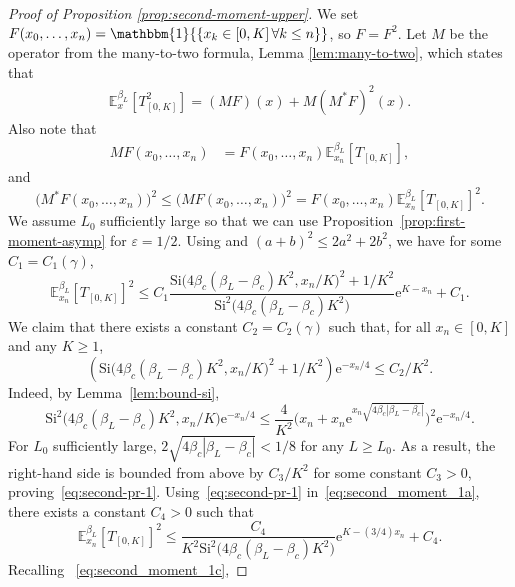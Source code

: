 \documentclass[a4paper, a4wide, 10pt, reqno]{amsart}
\theoremstyle{plain}
\theoremstyle{definition}
\numberwithin{equation}{section}
\newcommand{\E}{\mathbb E}
\newcommand{\re}{{\mathrm e}}
\newcommand{\Si}{{\mathrm{Si}}}
\newcommand{\Ind}[1]{\mathbbm{1}{\{#1\}}}
\begin{document}
\begin{proof}[Proof of  Proposition \ref{prop:second-moment-upper}]
	We set $F(x_0,\ldots,x_n) = \Ind{x_k\in [0, K]\,\forall k\le n}$, so $F=F^2$. Let $M$ be the operator from the many-to-two formula, Lemma \ref{lem:many-to-two}, which states that
	\begin{align}
		\label{eq:second_moment_1}
		\E_x^{\beta_L}[T_{[0, K]}^2] = (MF)(x) + M(M^\ast F)^2(x).
	\end{align}
	Also note that
\begin{align}\label{eq:second_moment_1b}
		MF(x_0,\ldots,x_n) &= F(x_0,\ldots,x_n)\E_{x_n}^{\beta_L}[T_{[0, K]}],
	\end{align}
    and 
    \begin{equation}\label{eq:second_moment_1c}
        \big(M^\ast F(x_0,\ldots,x_n)\big)^2 \le (M F(x_0,\ldots, x_n)\big)^2=F(x_0,\ldots,x_n)\E_{x_n}^{\beta_L}[T_{[0, K]}]^2.
    \end{equation}
    We assume $L_0$ sufficiently large so that we can use
	 Proposition~\ref{prop:first-moment-asymp} for $\varepsilon=1/2$. Using and $(a+b)^2\le 2a^2+2b^2$, we have  for some $C_1=C_1(\gamma)$, 
    \begin{equation}\label{eq:second_moment_1a}
    \E_{x_n}^{\beta_L}[T_{[0, K]}]^2 \le C_1 \frac{\Si\big(4\beta_c(\beta_L-\beta_c) K^2, x_n/K\big)^2 + 1/ K^2}{\Si^2\big(4\beta_c({\beta_L}-\beta_c)K^2\big)} \re^{ K-x_n} + C_1.
    \end{equation}
    We claim that there exists a constant $C_2=C_2(\gamma)$ such that, for all $x_n\in[0,  K]$ and any $ K\ge 1$,
    \begin{equation}\label{eq:second-pr-1}
    \left(\Si\big(4\beta_c({\beta_L}-\beta_c) K^2, x_n/ K\big)^2 + 1/ K^2\right)\re^{- x_n/4}\le C_2/ K^2.
    \end{equation}
    Indeed, by Lemma~\ref{lem:bound-si},
    \[
    \Si^2\big(4\beta_c({\beta_L}-\beta_c) K^2, x_n/ K\big)\re^{-x_n/4} \le \frac{4}{ K^2}\Big(x_n+x_n\re^{x_n\sqrt{4\beta_c|{\beta_L}-\beta_c|}}\Big)^2\re^{-x_n/4}.
    \]
    For $L_0$ sufficiently large, $2\sqrt{4\beta_c|{\beta_L}-\beta_c|}<1/8$ for any $L\ge L_0$.
    As a result, the right-hand side is bounded from above by $C_3/ K^2$ for some constant $C_3>0$, proving~\eqref{eq:second-pr-1}. Using~\eqref{eq:second-pr-1} in~\eqref{eq:second_moment_1a}, there exists a constant $C_4>0$ such that 
    \[
    \E_{x_n}^{{\beta_L}}[T_{[0, K]}]^2 \le  \frac{C_4}{ K^2\Si^2\big(4\beta_c({\beta_L}-\beta_c) K^2\big)} \re^{ K-(3/4)x_n} + C_4.
    \]
    Recalling~ \eqref{eq:second_moment_1c}, 

\end{proof}
\end{document}
